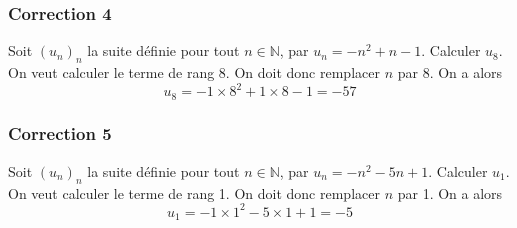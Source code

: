 \documentclass[15pt, mathserif]{beamer}
\newcommand{\N}{\mathbb{N}}			%
\begin{document}
\begin{frame}
\vspace{-10mm}
	\frametitle{Correction 4}
Soit $(u_n)_n$ la suite définie pour tout $n \in \N$, par $u_n=-n^2+n-1$. Calculer $u_{8}$. 
 \vfil 
  On veut calculer le terme de rang 8. 
 \vfil 
 On doit donc remplacer $n$ par 8. On a alors $$u_{8}=-1\times 8^2+1\times8-1=-57$$\end{frame}


\begin{frame}
\vspace{-10mm}
	\frametitle{Correction 5}
Soit $(u_n)_n$ la suite définie pour tout $n \in \N$, par $u_n=-n^2-5n+1$. Calculer $u_{1}$. 
 \vfil 
  On veut calculer le terme de rang 1. 
 \vfil 
 On doit donc remplacer $n$ par 1. On a alors $$u_{1}=-1\times 1^2-5\times1+1=-5$$\end{frame}
\end{document}
